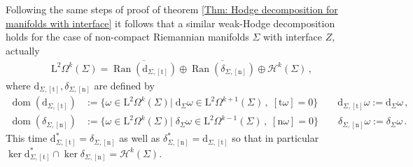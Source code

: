 	Following the same steps of proof of theorem \ref{Thm: Hodge decomposition for manifolds with interface} it follows that a similar weak-Hodge decomposition holds for the case of non-compact Riemannian manifolds $\Sigma$ with interface $Z$, actually
	\begin{align}\label{Eqn: weak-Hodge decomposition for interface}
		\mathrm{L}^2\Omega^k(\Sigma)=
		\overline{\operatorname{Ran}(\mathrm{d}_{\Sigma,[\mathrm{t}]})}\oplus
		\overline{\operatorname{Ran}(\delta_{\Sigma,[\mathrm{n}]})}\oplus
		\mathcal{H}^k(\Sigma)\,,
	\end{align}
	where $\mathrm{d}_{\Sigma,[\mathrm{t}]}, \delta_{\Sigma,[\mathrm{n}]}$ are defined by
	\begin{align*}
	\operatorname{dom}(\mathrm{d}_{\Sigma,[\mathrm{t}]})&:=\lbrace
	\omega\in\mathrm{L}^2\Omega^k(\Sigma)|\;\mathrm{d}_\Sigma\omega\in\mathrm{L}^2\Omega^{k+1}(\Sigma)\,,\;[\mathrm{t}\omega]=0\rbrace\qquad
	\mathrm{d}_{\Sigma,[\mathrm{t}]}\omega:=\mathrm{d}_\Sigma\omega\,,\\
	\operatorname{dom}(\delta_{\Sigma,[\mathrm{n}]})&:=\lbrace
	\omega\in\mathrm{L}^2\Omega^k(\Sigma)|\;\delta_\Sigma\omega\in\mathrm{L}^2\Omega^{k-1}(\Sigma)\,,\;[\mathrm{n}\omega]=0\rbrace\qquad
	\delta_{\Sigma,[\mathrm{n}]}\omega:=\delta_\Sigma\omega\,.
	\end{align*}
	This time $\mathrm{d}_{\Sigma,[\mathrm{t}]}^*=\delta_{\Sigma,[\mathrm{n}]}$ as well as $\delta_{\Sigma,[\mathrm{n}]}^*=\mathrm{d}_{\Sigma,[\mathrm{t}]}$ so that in particular $\ker\mathrm{d}_{\Sigma,[\mathrm{t}]}^*\cap\ker\delta_{\Sigma,[\mathrm{n}]}=\mathcal{H}^k(\Sigma)$.
	

	
	

